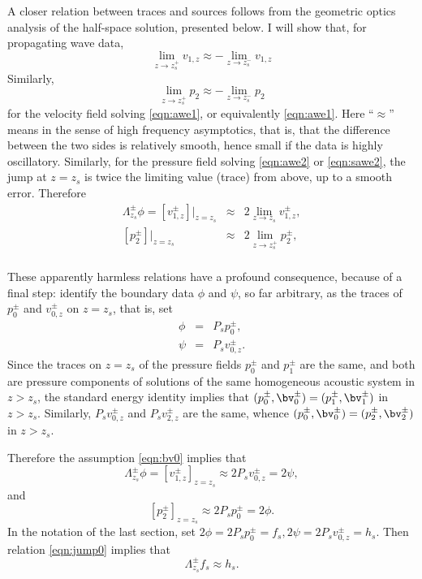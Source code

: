 A closer relation between traces and sources follows from the
geometric optics analysis of the half-space solution, presented
below. I will show that, for propagating wave data,
\begin{equation}
  \label{eqn:odd1}
  \lim_{z\rightarrow z_s^+} v_{1,z} \approx - \lim_{z\rightarrow z_s^-}
  v_{1,z}
\end{equation}
Similarly,
\begin{equation}
  \label{eqn:odd2}
  \lim_{z\rightarrow z_s^+} p_{2} \approx - \lim_{z\rightarrow z_s^-}
  p_{2}
\end{equation}
for the velocity field solving \ref{eqn:awe1}, or equivalently
\ref{eqn:awe1}. Here ``$\approx$'' means in the sense of high
frequency asymptotics, that is, that the difference between the two
sides is relatively smooth, hence small if the data is highly
oscillatory. Similarly, for the pressure field solving \ref{eqn:awe2}
or \ref{eqn:sawe2}, the jump at $z=z_s$ is twice the limiting value
(trace) from above, up to a smooth error. Therefore
\begin{eqnarray}
  \Lambda^{\pm}_{z_s}\phi = [v^{\pm}_{1,z}]|_{z=z_s} &\approx& 2
                              \lim_{z\rightarrow z_s}v^{\pm}_{1,z},\\  \label{eqn:tracejump1}
  [p^{\pm}_2]|_{z=z_s} &\approx& 2 \lim_{z\rightarrow z_s^+}p^{\pm}_{2},\\  \label{eqn:tracejump2}
\end{eqnarray}

These apparently harmless relations have a profound consequence,
because of a final step: identify the boundary data $\phi$ and $\psi$,
so far arbitrary, as the traces of $p^{\pm}_0$ and $v^{\pm}_{0,z}$ on $z=z_s$,
that is, set
\begin{eqnarray}
  \phi & = & P_s p^{\pm}_0, \nonumber \\
  \psi & = & P_s v^{\pm}_{0,z}.
             \label{eqn:bv0}
\end{eqnarray}
Since the traces on $z=z_s$ of the pressure fields $p^{\pm}_0$ and $p^{\pm}_1$ are
the same, and both are pressure components of solutions of the same homogeneous
acoustic system in $z>z_s$, the standard energy identity implies that
$(p^{\pm}_0,\bv^{\pm}_0) = (p^{\pm}_1,\bv^{\pm}_1)$ in
$z > z_s$. Similarly, $P_sv^{\pm}_{0,z}$ and $P_sv^{\pm}_{2,z}$ are
the same, whence $(p^{\pm}_0,\bv^{\pm}_0) = (p^{\pm}_2,\bv^{\pm}_2)$ in
$z>z_s$.

Therefore the assumption \ref{eqn:bv0} implies that
\begin{equation}
  \label{eqn:jump0}
  \Lambda^{\pm}_{z_s}\phi = [v^{\pm}_{1,z}]_{z=z_s} \approx 2P_s v^{\pm}_{0,z}  = 2\psi,
\end{equation}
and
\begin{equation}
  \label{eqn:jump1}
[p_2^{\pm}]_{z=z_s} \approx  2P_s p^{\pm}_{0}= 2 \phi.           
\end{equation}
In the notation of the last section, set $2 \phi = 2P_sp^{\pm}_0= f_s,
2\psi = 2P_s v^{\pm}_{0,z}= h_s$. Then relation \ref{eqn:jump0}
implies that
\begin{equation}
  \label{eqn:lamfh}
  \Lambda^{\pm}_{z_s}f_s \approx h_s.
\end{equation}

